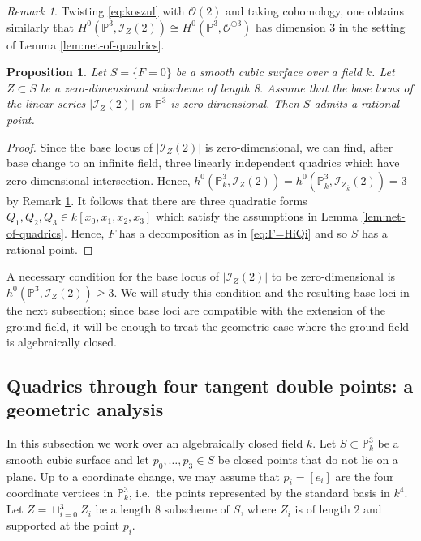 \documentclass[a4paper,11pt]{amsart}
\numberwithin{equation}{section}
\newtheorem{proposition}[theorem]{Proposition}
\theoremstyle{definition}
\theoremstyle{remark}
\newtheorem{remark}[theorem]{Remark}
\newcommand{\PP}{\mathbb P}
\newcommand{\CP}{\PP}
\begin{document}
\begin{remark} \label{rem:h^0(I_Z)=3}
Twisting \eqref{eq:koszul} with $\mathcal O(2)$ and taking cohomology, one obtains similarly that $H^0(\CP^3, \mathcal I_{Z}(2))\cong H^0(\CP^3,\mathcal O^{\oplus 3} )$ has dimension 3 in the setting of Lemma \ref{lem:net-of-quadrics}. 
\end{remark}

\begin{proposition} \label{prop:existence-of-point}
Let $S=\{F=0\}$ be a smooth cubic surface over a field $k$.
Let $Z\subset S$ be a zero-dimensional subscheme of length 8.
Assume that the base locus of the linear series $|\mathcal I_Z(2)|$ on $\CP^3$ is zero-dimensional.
Then $S$ admits a rational point.
\end{proposition}

\begin{proof}
Since the base locus of $|\mathcal I_Z(2)|$ is zero-dimensional, we can find, after base change to an infinite field, three linearly independent quadrics which have zero-dimensional intersection.
Hence, $h^0(\CP^3_k, \mathcal I_{Z}(2))=h^0(\CP^3_{\bar k}, \mathcal I_{Z_{\bar k}}(2))=3$ by Remark \ref{rem:h^0(I_Z)=3}.
It follows that there are three quadratic forms $Q_1,Q_2,Q_3\in k[x_0,x_1,x_2,x_3]$ which satisfy the assumptions in Lemma \ref{lem:net-of-quadrics}.
Hence, $F$ has a decomposition as in \eqref{eq:F=HiQi} and so $S$ has a rational point.
\end{proof}

A necessary condition for the base locus of $|\mathcal I_Z(2)|$ to be zero-dimensional is $h^0(\CP^3,\mathcal I_Z(2))\geq 3$.
We will study this condition and the resulting base loci in the next subsection; since base loci are compatible with the extension of the ground field, it will be enough to treat the geometric case where the ground field is algebraically closed. 

\subsection{Quadrics through four tangent double points: a geometric analysis} \label{sec:quadrics}

 In this subsection we work over an algebraically closed field $k$.
 Let $S\subset \CP^3_k$ be a smooth cubic surface and let $p_0,\dots ,p_3\in S$ be closed points that do not lie on a plane.
 Up to a coordinate change, we may assume that $p_i=[e_i]$ are the four coordinate vertices in $\CP^3_k$, i.e.~the points represented by the standard basis in $k^4$.
 Let $Z=\sqcup_{i=0}^3Z_i$ be a length 8 subscheme of $S$, where $Z_i$ is of length $2$ and supported at the point $p_i$. 
 
\end{document}
